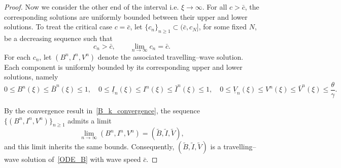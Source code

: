 \documentclass[11pt]{article}
\theoremstyle{definition}
\begin{document}
{\begin{proof}
 Now we consider the other end of the interval i.e. $\xi \to \infty$. For all $c>\bar{c}$,
the corresponding solutions are uniformly bounded between their upper and lower
solutions. To treat the critical case $c=\bar{c}$, let
$\{c_n\}_{n\ge 1}\subset(\bar{c},c_N]$, for some fixed $N$, be a decreasing sequence
such that
\[
c_n>\bar{c}, \qquad \lim_{n\to\infty} c_n=\bar{c}.
\]
For each $c_n$, let $(B^n,I^n,V^n)$ denote the associated travelling–wave solution.
Each component is uniformly bounded by its corresponding upper and lower
solutions, namely
\[
0 \le B^n(\xi) \le \bar B^n(\xi) \le 1, \quad
0 \le \underline{I}_n(\xi) \le I^n(\xi) \le \bar I^n(\xi) \le 1, \quad
0 \le \underline{V}_n(\xi) \le V^n(\xi) \le \bar V^n(\xi) \le \frac{\theta}{\gamma}.
\]

By the convergence result in~\eqref{B_k_convergence}, the sequence
$\{(B^n,I^n,V^n)\}_{n\ge1}$ admits a limit
\[
\lim_{n\to\infty}(B^n,I^n,V^n)=(\tilde B,\tilde I,\tilde V),
\]
and this limit inherits the same bounds. Consequently,
$(\tilde B,\tilde I,\tilde V)$ is a travelling–wave solution of~\eqref{ODE_B} with
wave speed $\bar{c}$.






\end{proof}}
\end{document}
